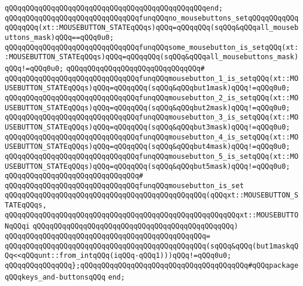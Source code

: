 \verb|qQQqqQQqqQQqqQQqqQQqqQQqqQQqqQQqqQQqqQQqqQQqqQQqend;|\newline
\newline
\verb|qQQqqQQqqQQqqQQqqQQqqQQqqQQqqQQqfunqQQqno_mousebuttons_setqQQqqQQqqQQqqQQqqQQq(xt::MOUSEBUTTON_STATEqQQqs)qQQq=qQQqqQQq(sqQQq&qQQqall_mousebuttons_mask)qQQq==qQQq0u0;|\newline
\verb|qQQqqQQqqQQqqQQqqQQqqQQqqQQqqQQqfunqQQqsome_mousebutton_is_setqQQq(xt::MOUSEBUTTON_STATEqQQqs)qQQq=qQQqqQQq(sqQQq&qQQqall_mousebuttons_mask)qQQq!=qQQq0u0;|\newline
\verb|qQQqqQQqqQQqqQQqqQQqqQQqqQQqqQQq#|\newline
\verb|qQQqqQQqqQQqqQQqqQQqqQQqqQQqqQQqfunqQQqmousebutton_1_is_setqQQq(xt::MOUSEBUTTON_STATEqQQqs)qQQq=qQQqqQQq(sqQQq&qQQqbut1mask)qQQq!=qQQq0u0;|\newline
\verb|qQQqqQQqqQQqqQQqqQQqqQQqqQQqqQQqfunqQQqmousebutton_2_is_setqQQq(xt::MOUSEBUTTON_STATEqQQqs)qQQq=qQQqqQQq(sqQQq&qQQqbut2mask)qQQq!=qQQq0u0;|\newline
\verb|qQQqqQQqqQQqqQQqqQQqqQQqqQQqqQQqfunqQQqmousebutton_3_is_setqQQq(xt::MOUSEBUTTON_STATEqQQqs)qQQq=qQQqqQQq(sqQQq&qQQqbut3mask)qQQq!=qQQq0u0;|\newline
\verb|qQQqqQQqqQQqqQQqqQQqqQQqqQQqqQQqfunqQQqmousebutton_4_is_setqQQq(xt::MOUSEBUTTON_STATEqQQqs)qQQq=qQQqqQQq(sqQQq&qQQqbut4mask)qQQq!=qQQq0u0;|\newline
\verb|qQQqqQQqqQQqqQQqqQQqqQQqqQQqqQQqfunqQQqmousebutton_5_is_setqQQq(xt::MOUSEBUTTON_STATEqQQqs)qQQq=qQQqqQQq(sqQQq&qQQqbut5mask)qQQq!=qQQq0u0;|\newline
\verb|qQQqqQQqqQQqqQQqqQQqqQQqqQQqqQQq#|\newline
\verb|qQQqqQQqqQQqqQQqqQQqqQQqqQQqqQQqfunqQQqmousebutton_is_set|\newline
\verb|qQQqqQQqqQQqqQQqqQQqqQQqqQQqqQQqqQQqqQQqqQQqqQQq(qQQqxt::MOUSEBUTTON_STATEqQQqs,|\newline
\verb|qQQqqQQqqQQqqQQqqQQqqQQqqQQqqQQqqQQqqQQqqQQqqQQqqQQqqQQqxt::MOUSEBUTTONqQQqi|\newline
\verb|qQQqqQQqqQQqqQQqqQQqqQQqqQQqqQQqqQQqqQQqqQQqqQQq)|\newline
\verb|qQQqqQQqqQQqqQQqqQQqqQQqqQQqqQQqqQQqqQQqqQQqqQQq=|\newline
\verb|qQQqqQQqqQQqqQQqqQQqqQQqqQQqqQQqqQQqqQQqqQQqqQQq(sqQQq&qQQq(but1maskqQQq<<qQQqunt::from_intqQQq(iqQQq-qQQq1)))qQQq!=qQQq0u0;|\newline
\newline
\verb|qQQqqQQqqQQqqQQq};qQQqqQQqqQQqqQQqqQQqqQQqqQQqqQQqqQQqqQQq#qQQqpackageqQQqkeys_and-buttonsqQQq|\newline
\verb|end;|\newline
\newline

